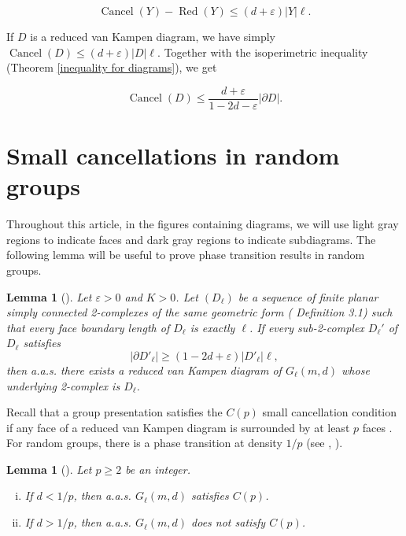 \documentclass[a4paper]{article}
\DeclareMathOperator{\Red}{Red}
\DeclareMathOperator{\Cancel}{Cancel}
\newtheorem{lem}[thm]{Lemma}
\theoremstyle{remark}
\begin{document}
\begin{equation}\label{useful reduced inequality}
    \Cancel(Y)-\Red(Y)\leq (d+\varepsilon)|Y|\ell.
\end{equation}

If $D$ is a reduced van Kampen diagram, we have simply $\Cancel(D) \leq (d+\varepsilon)|D|\ell.$ Together with the isoperimetric inequality (Theorem \ref{inequality for diagrams}), we get

\begin{equation}\label{useful diagram inequality}
    \Cancel(D)\leq \frac{d+\varepsilon}{1-2d-\varepsilon}|\partial D|.
\end{equation}

\section{Small cancellations in random groups}
Throughout this article, in the figures containing diagrams, we will use light gray regions to indicate faces and dark gray regions to indicate subdiagrams. The following lemma will be useful to prove phase transition results in random groups.
\begin{lem}[{\cite[Corollary 1.7]{Tsa22b}}]\label{existence of diagrams} Let $\varepsilon>0$ and $K>0$. Let $(D_\ell)$ be a sequence of finite planar simply connected 2-complexes of the same geometric form (\cite{Tsa22b} Definition 3.1) such that every face boundary length of $D_\ell$ is exactly $\ell$. If every sub-2-complex $D_\ell'$ of $D_\ell$ satisfies
    \[|\partial D'_\ell|\geq (1-2d+\varepsilon)|D'_\ell|\ell,\]
then a.a.s. there exists a reduced van Kampen diagram of $G_\ell(m,d)$ whose underlying 2-complex is $D_\ell$.
\end{lem}\quad

Recall that a group presentation satisfies the $C(p)$ small cancellation condition if any face of a reduced van Kampen diagram is surrounded by at least $p$ faces \cite{LS77}. For random groups, there is a phase transition at density $1/p$ (see \cite{OW11}, \cite{Tsa22b}).

\begin{lem}[{\cite[Proposition 4.2]{Tsa22b}}]\label{C of p} Let $p\geq 2$ be an integer. 
\begin{enumerate}[(i)]
    \item If $d<1/p$, then a.a.s. $G_\ell(m,d)$ satisfies $C(p)$.
    \item If $d>1/p$, then a.a.s. $G_\ell(m,d)$ does not satisfy $C(p)$.
\end{enumerate}
\end{lem}
\end{document}
